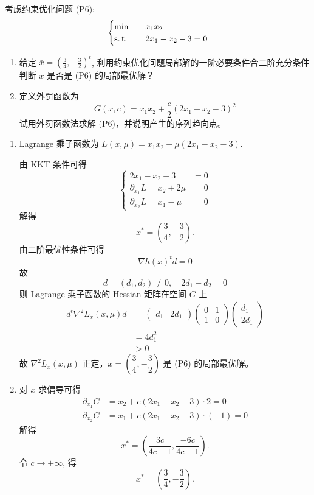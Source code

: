 \begin{Problem}
    考虑约束优化问题 (P6):
    \[\begin{cases}
        \min \quad &x_1x_2\\
        \operatorname{s.t.} \quad &2x_1 - x_2 - 3 = 0
    \end{cases}\]
    \begin{enumerate}
        \item 给定 $\bar{x} = \left(\frac{3}{4}, -\frac{3}{2}\right)^t$, 利用约束优化问题局部解的一阶必要条件合二阶充分条件判断 $\bar{x}$ 是否是 (P6) 的局部最优解？
        \item 定义外罚函数为
        \[G(x, c) = x_1x_2 + \dfrac{c}{2}\left(2x_1 - x_2 - 3\right)^2\]
        试用外罚函数法求解 (P6)，并说明产生的序列趋向点。
    \end{enumerate}

    \Answer \text{}
    \begin{enumerate}
        \item Lagrange 乘子函数为 $L(x, \mu) = x_1x_2 + \mu(2x_1 - x_2 - 3)$.
        
        由 KKT 条件可得 
        \[\begin{cases}
            2x_1 - x_2 - 3 &= 0\\
            \partial_{x_1}L = x_2 + 2\mu &= 0\\
            \partial_{x_2}L = x_1 - \mu &= 0
        \end{cases}\]
        解得
        \[x^* = \left(\dfrac{3}{4}, -\dfrac{3}{2}\right).\]
        由二阶最优性条件可得 
        \[\nabla h(x)^td = 0\]
        故
        \[d = \left(d_1, d_2\right) \neq 0,\quad 2d_1 - d_2 = 0\]
        则 Lagrange 乘子函数的 Hessian 矩阵在空间 $G$ 上 
        \begin{align*}
            d^t\nabla^2L_x(x, \mu)d &= \begin{pmatrix}
                d_1 & 2d_1
            \end{pmatrix}\begin{pmatrix}
                0 & 1 \\ 1 & 0
            \end{pmatrix}\begin{pmatrix}
                d_1 \\ 2d_1
            \end{pmatrix}\\
            &= 4d_1^2\\
            &> 0
        \end{align*}
        故 $\nabla^2L_x(x, \mu)$ 正定，$\bar{x} = \left(\dfrac{3}{4}, -\dfrac{3}{2}\right)$ 是 (P6) 的局部最优解。
        \item 对 $x$ 求偏导可得 
        \begin{align*}
            \partial_{x_1}G &= x_2 + c(2x_1 - x_2 - 3) \cdot 2 = 0\\
            \partial_{x_2}G &= x_1 + c(2x_1 - x_2 - 3) \cdot (-1) = 0
        \end{align*}
        解得 
        \[x^* = \left(\dfrac{3c}{4c - 1}, \dfrac{-6c}{4c - 1}\right).\]
        令 $c \to +\infty$, 得
        \[x^* = \left(\dfrac{3}{4}, -\dfrac{3}{2}\right).\]
    \end{enumerate}
\end{Problem}

